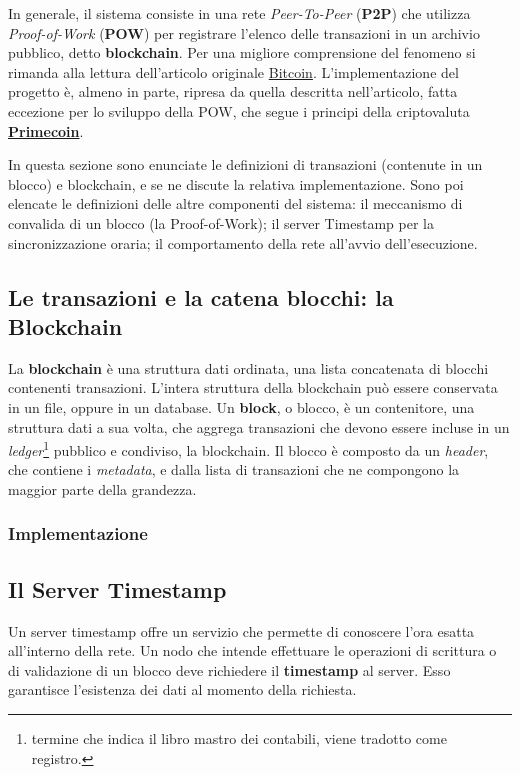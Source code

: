 In generale, il sistema consiste in una rete \textit{Peer-To-Peer} (\textbf{P2P}) che utilizza \textit{Proof-of-Work} (\textbf{POW}) per registrare l'elenco delle transazioni in un archivio pubblico, detto \textbf{blockchain}. Per una migliore comprensione del fenomeno si rimanda alla lettura dell'articolo originale \href{https://bitcoin.org/bitcoin.pdf}{Bitcoin}. 
L'implementazione del progetto è, almeno in parte, ripresa da quella descritta nell'articolo, fatta eccezione per lo sviluppo della POW, che segue i principi della criptovaluta \href{http://primecoin.io/bin/primecoin-paper.pdf}{\textbf{Primecoin}}.

In questa sezione sono enunciate le definizioni di transazioni (contenute in un blocco) e blockchain, e se ne discute la relativa implementazione. Sono poi elencate le definizioni delle altre componenti del sistema: il meccanismo di convalida di un blocco (la Proof-of-Work); il server Timestamp per la sincronizzazione oraria; il comportamento della rete all'avvio dell'esecuzione.

\subsection{Le transazioni e la catena blocchi: la Blockchain}
La \textbf{blockchain} è una struttura dati ordinata, una lista concatenata di blocchi contenenti transazioni. L'intera struttura della blockchain può essere conservata in un file, oppure in un database. Un \textbf{block}, o blocco, è un contenitore, una struttura dati a sua volta, che aggrega transazioni che devono essere incluse in un \textit{ledger}\footnote{termine che indica il libro mastro dei contabili, viene tradotto come registro.} pubblico e condiviso, la blockchain. 
Il blocco è composto da un \textit{header}, che contiene i \textit{metadata}, e dalla lista di transazioni che ne compongono la maggior parte della grandezza.

\subsubsection{Implementazione}

\subsection{Il Server Timestamp}
Un server timestamp offre un servizio che permette di conoscere l'ora esatta all'interno della rete. Un nodo che intende effettuare le operazioni di scrittura o di validazione di un blocco deve richiedere il \textbf{timestamp} al server. Esso garantisce l'esistenza dei dati al momento della richiesta.


